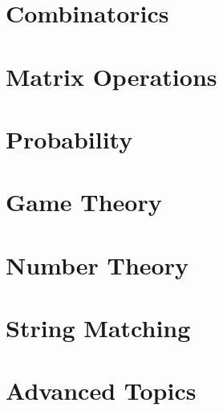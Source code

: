 \documentclass[12pt,letterpaper]{book}
\theoremstyle{definition}
\theoremstyle{remark}
\begin{document}

\chapter{Combinatorics}


\chapter{Matrix Operations}


\chapter{Probability}


\chapter{Game Theory}


\chapter{Number Theory}


\chapter{String Matching}


\chapter{Advanced Topics}

\end{document}
